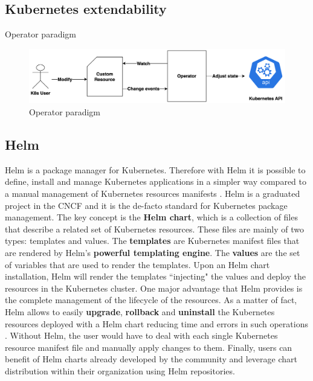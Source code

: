 




\subsection{Kubernetes extendability}

Operator paradigm

\begin{figure}[H]
    \centering
    \includegraphics[width=1\linewidth]{images/opeartor_paradigm.png}
    \caption{Operator paradigm}
    \label{fig:operator_paradigm}
\end{figure}

\subsection{Helm}

Helm is a package manager for Kubernetes. Therefore with Helm it is possible to define, install and manage Kubernetes applications in a simpler way compared to a manual management of Kubernetes resources manifests \cite{helm}.
Helm is a graduated project in the CNCF and it is the de-facto standard for Kubernetes package management.
The key concept is the \textbf{Helm chart}, which is a collection of files that describe a related set of Kubernetes resources. 
These files are mainly of two types: templates and values.
The \textbf{templates} are Kubernetes manifest files that are rendered by Helm's \textbf{powerful templating engine}. 
The \textbf{values} are the set of variables that are used to render the templates.
Upon an Helm chart installation, Helm will render the templates ``injecting" the values and deploy the resources in the Kubernetes cluster.
One major advantage that Helm provides is the complete management of the lifecycle of the resources.
As a matter of fact, Helm allows to easily \textbf{upgrade}, \textbf{rollback} and \textbf{uninstall} the Kubernetes resources deployed with a Helm chart reducing time and errors in such operations \cite{helm}. 
Without Helm, the user would have to deal with each single Kubernetes resource manifest file and manually apply changes to them.
Finally, users can benefit of Helm charts already developed by the community and leverage chart distribution within their organization using Helm repositories.

